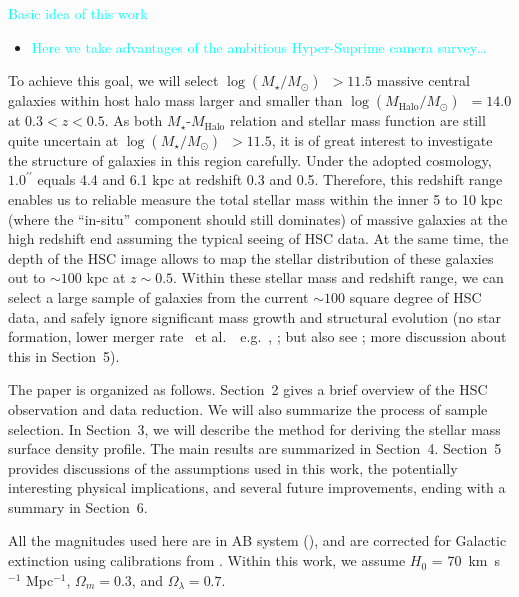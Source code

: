 \documentclass[preprint]{aastex}
\def\arcsec{{\prime\prime}}
\def\etal{{\ et al.~}}
\def\logms{{$\log (M_{\star}/M_{\odot})$}~}
\def\logmh{{$\log (M_{\mathrm{Halo}}/M_{\odot})$}~}
\newcommand{\plan}[1]{\textcolor{cyan}{#1}}
\begin{document}
\begin{CJK*}{UTF8}{gbsn}
    \plan{Basic idea of this work}
    \begin{itemize}
        \item \plan{Here we take advantages of the ambitious Hyper-Suprime camera 
            survey\ldots}
    \end{itemize}
    
    To achieve this goal, we will select \logms$ > 11.5$ massive central galaxies within
    host halo mass larger and smaller than \logmh$= 14.0$ at $0.3 < z < 0.5$.  
    As both $M_{\star}$-$M_{\mathrm{Halo}}$ relation and stellar mass function are still
    quite uncertain at \logms$ > 11.5$, it is of great interest to investigate the
    structure of galaxies in this region carefully. 
    Under the adopted cosmology, $1.0^{\arcsec}$ equals 4.4 and 6.1 kpc at redshift 0.3 
    and 0.5.  
    Therefore, this redshift range enables us to reliable measure the total stellar mass 
    within the inner 5 to 10 kpc (where the ``in-situ'' component should still dominates) 
    of massive galaxies at the high redshift end assuming the typical seeing of HSC data. 
    At the same time, the depth of the HSC image allows to map the stellar distribution 
    of these galaxies out to $\sim 100$ kpc at $z\sim 0.5$.  
    Within these stellar mass and redshift range, we can select a large sample of 
    galaxies from the current $\sim 100$ square degree of HSC data, and safely ignore 
    significant mass growth and structural evolution (no star formation, 
    lower merger rate \etal~e.g.\ \citealt{Bellstedt2016}, \citealt{Inagaki2015}; 
    but also see \citealt{Bai2014}; more discussion about this in Section~5). 

    The paper is organized as follows. Section~2 gives a brief overview of the HSC
    observation and data reduction.  We will also summarize the process of sample
    selection.  In Section~3, we will describe the method for deriving the stellar mass 
    surface density profile.  The main results are summarized in Section~4.  Section~5 
    provides discussions of the assumptions used in this work, the potentially interesting
    physical implications, and several future improvements, ending with a summary in
    Section~6.

    All the magnitudes used here are in AB system (\citealt{Oke1983}), and are corrected 
    for Galactic extinction using calibrations from \citet{Schlafly11}.
    Within this work, we assume $H_0$ = 70~km~s$^{-1}$ Mpc$^{-1}$, ${\Omega}_m=0.3$, 
    and ${\Omega}_{\lambda}=0.7$. 
    

\end{CJK*}
\end{document}
